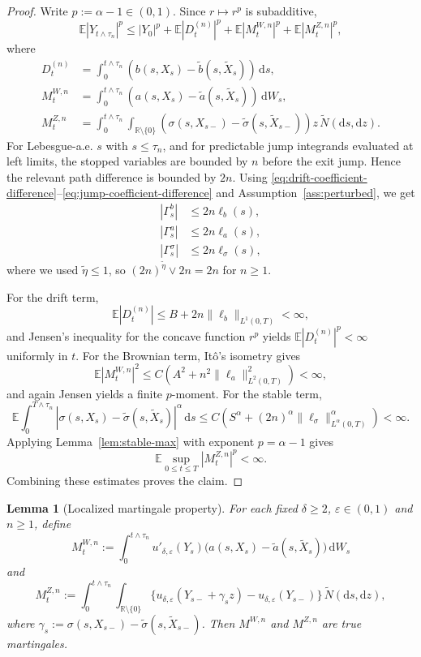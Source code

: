 \documentclass[11pt]{article}
\newtheorem{lemma}[theorem]{Lemma}
\newcommand{\R}{\mathbb{R}}
\newcommand{\E}{\mathbb{E}}
\newcommand{\1}{\mathbf{1}}
\newcommand{\dd}{\,\mathrm{d}}
\newcommand{\md}{\mathrm{d}}
\newcommand{\wt}{\tilde}
\newcommand{\eps}{\varepsilon}
\begin{document}
\begin{proof}
Write $p:=\alpha-1\in(0,1)$. Since $r\mapsto r^p$ is subadditive,
\[
  \E|Y_{t\wedge\tau_n}|^p
  \le |Y_0|^p+\E|D_t^{(n)}|^p+\E|M_t^{W,n}|^p+\E|M_t^{Z,n}|^p,
\]
where
\begin{align*}
D_t^{(n)}&=\int_0^{t\wedge\tau_n}(b(s,X_s)-\wt b(s,\wt X_s))\dd s,\\
M_t^{W,n}&=\int_0^{t\wedge\tau_n}(a(s,X_s)-\wt a(s,\wt X_s))\dd W_s,\\
M_t^{Z,n}&=\int_0^{t\wedge\tau_n}\int_{\R\setminus\{0\}}(\sigma(s,X_{s-})-\wt\sigma(s,\wt X_{s-}))z\,\wt N(\md s,\md z).
\end{align*}
For Lebesgue-a.e. $s$ with $s\le\tau_n$, and for predictable jump integrands evaluated at left limits, the stopped variables are bounded by $n$ before the exit jump. Hence the relevant path difference is bounded by $2n$. Using \eqref{eq:drift-coefficient-difference}--\eqref{eq:jump-coefficient-difference} and Assumption~\ref{ass:perturbed}, we get
\begin{align*}
|\Gamma_s^b|&\le 2n \ell_b(s),\\
|\Gamma_s^a|&\le 2n \ell_a(s),\\
|\Gamma_s^\sigma|&\le 2n \ell_\sigma(s),
\end{align*}
where we used $\wt\eta\le1$, so $(2n)^{\wt\eta}\vee 2n=2n$ for $n\ge1$.

For the drift term,
\[
  \E|D_t^{(n)}|
  \le B+2n\|\ell_b\|_{L^1(0,T)}<\infty,
\]
and Jensen's inequality for the concave function $r^p$ yields $\E|D_t^{(n)}|^p<\infty$ uniformly in $t$. For the Brownian term, It\^o's isometry gives
\[
  \E|M_t^{W,n}|^2
  \le C\left(A^2+n^2\|\ell_a\|_{L^2(0,T)}^2\right)<\infty,
\]
and again Jensen yields a finite $p$-moment. For the stable term,
\[
  \E\int_0^{T\wedge\tau_n}|\sigma(s,X_s)-\wt\sigma(s,\wt X_s)|^\alpha\dd s
  \le C\left(S^\alpha+(2n)^\alpha\|\ell_\sigma\|_{L^\alpha(0,T)}^\alpha\right)<\infty.
\]
Applying Lemma~\ref{lem:stable-max} with exponent $p=\alpha-1$ gives
\[
  \E\sup_{0\le t\le T}|M_t^{Z,n}|^p<\infty.
\]
Combining these estimates proves the claim.
\end{proof}

\begin{lemma}[Localized martingale property]\label{lem:localized-martingales}
For each fixed $\delta\ge2$, $\eps\in(0,1)$ and $n\ge1$, define
\[
M_t^{W,n}:=\int_0^{t\wedge\tau_n}u'_{\delta,\eps}(Y_s)
\bigl(a(s,X_s)-\wt a(s,\wt X_s)\bigr)\dd W_s
\]
and
\[
M_t^{Z,n}:=\int_0^{t\wedge\tau_n}\int_{\R\setminus\{0\}}
\{u_{\delta,\eps}(Y_{s-}+\gamma_s z)-u_{\delta,\eps}(Y_{s-})\}\,\wt N(\md s,\md z),
\]
where $\gamma_s:=\sigma(s,X_{s-})-\wt\sigma(s,\wt X_{s-})$. Then $M^{W,n}$ and $M^{Z,n}$ are true martingales.
\end{lemma}
\end{document}
